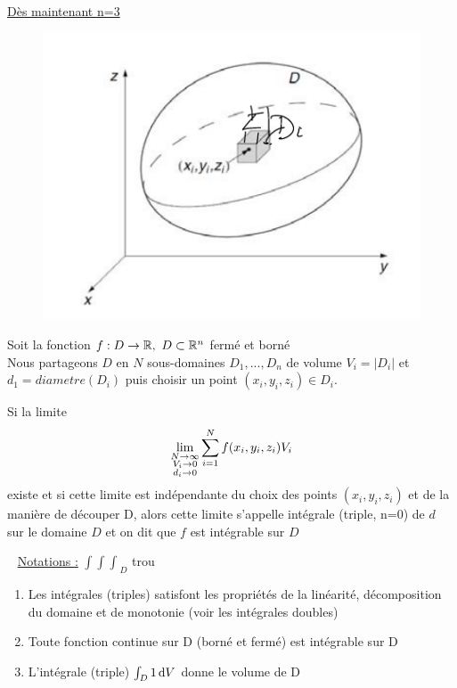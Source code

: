 \documentclass[12pt,a4paper]{article}
\begin{document}
\uline{Dès maintenant n=3}\\
\begin{figure}
	\includegraphics[scale=0.5]{images/n3}
\end{figure}
{Soit la fonction $f: D\to \R,\ D\subset \rn$ fermé et borné\\
Nous partageons $D$ en $N$ sous-domaines $D_1,...,D_n$ de volume $V_i = |D_i|$ et $d_1 = diametre(D_i)$ puis choisir un point $(x_i,y_i,z_i) \in D_i$}. 
\begin{boite}
 Si la limite 
\begin{equation*}
	\lim\limits_{\substack{N\to \infty\\V_i\to 0\\d_i\to 0}} \somme{N}{i=1} f(x_i,y_i,z_i)V_i
\end{equation*}
existe et si cette limite est indépendante du choix des points $(x_i,y_i,z_i)$ et de la manière de découper D, alors cette limite s'appelle intégrale (triple, n=0) de $d$ sur le domaine $D$ et on dit que $f$ est intégrable sur $D$
\end{boite}~
\uline{Notations :} ${\int\int\int}_D$ {trou}\\
\begin{boite}
	\begin{enumerate}
		\item 	Les intégrales (triples) satisfont les propriétés de la linéarité, décomposition du domaine et de monotonie (voir les intégrales doubles)
		\item 	Toute fonction continue sur D (borné et fermé) est intégrable sur D
		\item 	L'intégrale (triple) $\int_D 1 \deriv{V}$ donne le volume de D
	\end{enumerate}
\end{boite}
\end{document}
